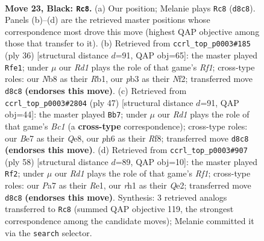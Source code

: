 \documentclass[11pt]{article}
\begin{document}
\begin{figure}[p]\centering
\begin{subfigure}{0.46\textwidth}\centering
\resizebox{\linewidth}{!}{%
\newchessgame
\chessboard[
  setfen={rn1r1k2/pb1qb2p/1pp3pP/3p1pP1/P2P1P2/1P2P1N1/8/R2QKBNR b KQ - 16 23},
  showmover=false,
  pgfstyle=straightmove, color=movearrow, markmove={d8-c8}
]}
\caption{}
\end{subfigure}\hfill
\begin{subfigure}{0.46\textwidth}\centering
\resizebox{\linewidth}{!}{%
\newchessgame
\chessboard[
  setfen={2k1rb1r/1p1q1pp1/p4n2/2pP1P2/3p3p/1P1B1Q1P/P1PP1NP1/1R3RK1 w - - 1 19},
  showmover=false,
  pgfstyle=straightmove, color=movearrow, markmove={f1-e1}
]}
\caption{}
\end{subfigure}
\\[4pt]
\begin{subfigure}{0.46\textwidth}\centering
\resizebox{\linewidth}{!}{%
\newchessgame
\chessboard[
  setfen={2b1qrk1/r1p1b2p/1p1pp3/p4pn1/P1PP1N2/1PB1P1P1/2Q2PB1/2RR2K1 b - - 0 24},
  showmover=false,
  pgfstyle=straightmove, color=movearrow, markmove={c8-b7}
]}
\caption{}
\end{subfigure}\hfill
\begin{subfigure}{0.46\textwidth}\centering
\resizebox{\linewidth}{!}{%
\newchessgame
\chessboard[
  setfen={2r2r2/3q1pbk/1p3np1/4p1Bp/p2pP2P/P2P1PP1/1P2Q1B1/4RR1K w - - 1 30},
  showmover=false,
  pgfstyle=straightmove, color=movearrow, markmove={f1-f2}
]}
\caption{}
\end{subfigure}
\caption{\textbf{Move 23, Black: \texttt{Rc8}.} (a) Our position; Melanie plays \texttt{Rc8} (\texttt{d8c8}). Panels (b)--(d) are the retrieved master positions whose correspondence most drove this move (highest QAP objective among those that transfer to it). (b) Retrieved from \texttt{ccrl\_top\_p0003\#185} (ply 36) [structural distance $d$=91, QAP obj=65]: the master played \texttt{Rfe1}; under $\mu$ our \emph{Rd1} plays the role of that game's \emph{Rf1}; cross-type roles: our \emph{N}b8 as their \emph{R}b1, our \emph{p}b3 as their \emph{N}f2; transferred move \texttt{d8c8} \textbf{(endorses this move)}. (c) Retrieved from \texttt{ccrl\_top\_p0003\#2804} (ply 47) [structural distance $d$=91, QAP obj=44]: the master played \texttt{Bb7}; under $\mu$ our \emph{Rd1} plays the role of that game's \emph{Bc1} (a \textbf{cross-type} correspondence); cross-type roles: our \emph{B}e7 as their \emph{Q}e8, our \emph{p}h6 as their \emph{R}f8; transferred move \texttt{d8c8} \textbf{(endorses this move)}. (d) Retrieved from \texttt{ccrl\_top\_p0003\#907} (ply 58) [structural distance $d$=89, QAP obj=10]: the master played \texttt{Rf2}; under $\mu$ our \emph{Rd1} plays the role of that game's \emph{Rf1}; cross-type roles: our \emph{P}a7 as their \emph{R}e1, our \emph{r}h1 as their \emph{Q}e2; transferred move \texttt{d8c8} \textbf{(endorses this move)}. Synthesis: 3 retrieved analogs transferred to \texttt{Rc8} (summed QAP objective 119, the strongest correspondence among the candidate moves); Melanie committed it via the \texttt{search} selector.}
\label{fig:thought-m45}
\end{figure}
\end{document}
